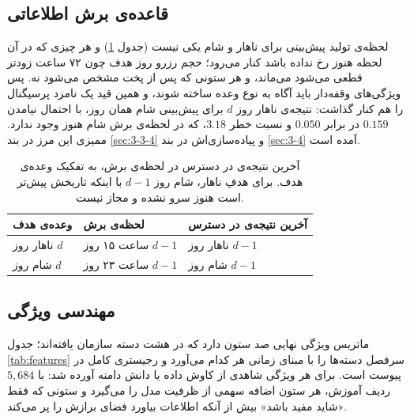 \subsection{قاعده‌ی برش اطلاعاتی}
\label{sec:3-2-2}

لحظه‌ی تولید پیش‌بینی برای ناهار و شام یکی نیست (جدول \ref{tab:cutoff}) و هر چیزی که
در آن لحظه هنوز رخ نداده باشد کنار می‌رود؛ حجم رزرو روز هدف چون ۷۲ ساعت زودتر قطعی
می‌شود می‌ماند، و هر ستونی که پس از پخت مشخص می‌شود نه. پس ویژگی‌های وقفه‌دار باید آگاه
به نوع وعده ساخته شوند، و همین قید یک نامزد پرسیگنال را هم کنار گذاشت: نتیجه‌ی ناهار
روز $d$ برای پیش‌بینی شام همان روز، با احتمال نیامدن $0.159$ در برابر $0.050$ و نسبت
خطر $3.18$، که در لحظه‌ی برش شام هنوز وجود ندارد. ممیزی این مرز در بند
\ref{sec:3-3-4} و پیاده‌سازی‌اش در بند \ref{sec:3-4} آمده است.

\begin{table}[!ht]
\centering
\footnotesize
\singlespacing
\renewcommand{\arraystretch}{0.9}
\caption[آخرین نتیجه‌ی در دسترس در لحظه‌ی برش، به تفکیک وعده‌ی هدف]{%
آخرین نتیجه‌ی در دسترس در لحظه‌ی برش، به تفکیک وعده‌ی هدف. برای هدفِ ناهار، شام روز
$d-1$ با اینکه تاریخش پیش‌تر است هنوز سرو نشده و مجاز نیست.}
\label{tab:cutoff}
\vspace{2mm}
\begin{tabular}{|p{3.0cm}|p{3.4cm}|p{3.8cm}|}
\hline
\textbf{وعده‌ی هدف} & \textbf{لحظه‌ی برش} & \textbf{آخرین نتیجه‌ی در دسترس} \\
\hline
ناهار روز $d$ & ساعت ۱۵ روز $d-1$ & ناهار روز $d-1$ \\
\hline
شام روز $d$ & ساعت ۲۳ روز $d-1$ & شام روز $d-1$ \\
\hline
\end{tabular}
\end{table}

\subsection{مهندسی ویژگی}
\label{sec:3-2-3}

ماتریس ویژگی نهایی صد ستون دارد که در هشت دسته سازمان یافته‌اند؛ جدول \ref{tab:features}
سرفصل دسته‌ها را با مبنای زمانی هر کدام می‌آورد و رجیستری کامل در پیوست است. برای هر
ویژگی شاهدی از کاوش داده یا دانش دامنه آورده شد: با $5{,}684$ ردیف آموزش، هر ستون
اضافه سهمی از ظرفیت مدل را می‌گیرد و ستونی که فقط «شاید مفید باشد» بیش از آنکه اطلاعات
بیاورد فضای برازش را پر می‌کند.

